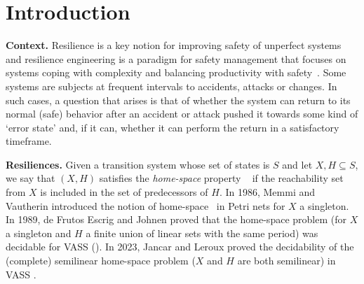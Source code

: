 \documentclass[runningheads]{llncs}
\newcommand{\alain}[1]{\todo[inline,color=red!20]{{\bf AF:} #1}}
\newcommand{\pred}{\textsf{pred}}
\newcommand{\post}{\textsf{post}}
\begin{document}




\newcommand{\LCM}{\mathsf{LCM}}
\newcommand{\LOGSPACE}{\mathsf{LOGSPACE}}
\newcommand{\MSO}{\mathsf{MSO}}
\newcommand{\SO}{\mathsf{SO}}

 \newcommand{\N}{\mathds{N}}



\section{Introduction}\label{section introduction}


{\bf Context.} 
Resilience is a key notion for improving safety of unperfect systems and resilience engineering is a paradigm for safety management that focuses on systems coping with complexity and balancing productivity with safety~\cite{challenges}. Some systems are subjects at frequent intervals to accidents, attacks or changes. 
In such cases, a question that arises is that of whether the system can return to its normal (safe) behavior after an accident or attack
pushed it towards some kind of ‘error state’ and, if it can, whether it can perform the return in a satisfactory timeframe. 

\noindent
{\bf Resiliences.}  
%
Given a transition system whose set of states is $S$ and let $X,H \subseteq S$, we say that $(X,H)$ satisfies the \emph{home-space} property ~\cite{DBLP:conf/ac/MemmiV86} if the reachability set from $X$ is included in the set of predecessors of $H$.
%
In 1986, Memmi and Vautherin introduced the notion of home-space~\cite{DBLP:conf/ac/MemmiV86} in Petri nets for $X$ a singleton. In 1989, de Frutos Escrig and Johnen proved that the home-space problem (for $X$ a singleton and $H$ a finite union of linear sets with the same period) was decidable for VASS (\cite{de1989decidability}). In 2023, Jancar and Leroux proved the decidability of the (complete) semilinear home-space problem ($X$ and $H$ are both semilinear)  in VASS \cite{DBLP:journals/corr/abs-2207-02697}.
%
\end{document}

